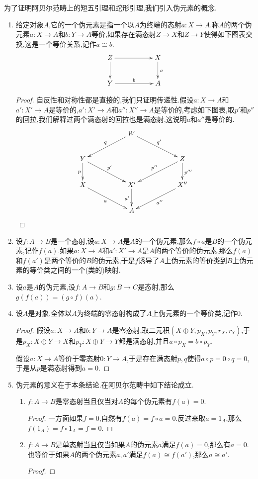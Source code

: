 为了证明阿贝尔范畴上的短五引理和蛇形引理,我们引入伪元素的概念.
\begin{enumerate}
	\item 给定对象$A$,它的一个伪元素是指一个以$A$为终端的态射$a:X\to A$.称$A$的两个伪元素$a:X\to A$和$b:Y\to A$等价,如果存在满态射$Z\to X$和$Z\to Y$使得如下图表交换,这是一个等价关系,记作$a\cong b$.
	$$\xymatrix{Z\ar[rr]\ar[d]&&X\ar[d]^a\\Y\ar[rr]^b&&A}$$
	\begin{proof}
		
		自反性和对称性都是直接的,我们只证明传递性.假设$a:X\to A$和$a':X'\to A$是等价的,$a':X'\to A$和$a'':X''\to A$是等价的,考虑如下图表,取$p'$和$p''$的回拉,我们解释过两个满态射的回拉也是满态射,这说明$a$和$a''$是等价的.
		$$\xymatrix{&&W\ar[dll]_q\ar[drr]^{q'}&&\\Y\ar[d]_p\ar[drr]^{p'}&&&&Z\ar[d]^{p'''}\ar[dll]_{p''}\\X\ar[drr]_a&&X'\ar[d]_{a'}&&X''\ar[dll]^{a''}\\&&A&&}$$
	\end{proof}
	\item 设$f:A\to B$是一个态射,设$a:X\to A$是$A$的一个伪元素,那么$f\circ a$是$B$的一个伪元素,记作$f(a)$.如果$a:X\to A$和$a':X'\to A$是$A$的两个等价的伪元素,那么$f(a)$和$f(a')$是两个等价的$B$的伪元素,于是$f$诱导了$A$上伪元素的等价类到$B$上伪元素的等价类之间的一个(类的)映射.
	\item 设$a$是$A$的伪元素,设$f:A\to B$和$g:B\to C$是态射,那么$g(f(a))=(g\circ f)(a)$.
	\item 设$A$是对象,全体以$A$为终端的零态射构成了$A$上伪元素的一个等价类,记作0.
	\begin{proof}
		
		假设$a:X\to A$和$b:Y\to A$是零态射,取二元积$(X\oplus Y,p_X,p_Y,r_X,r_Y)$,于是$p_X:X\oplus Y\to X$和$p_Y:X\oplus Y\to Y$都是满态射,并且$a\circ p_X=b\circ p_Y$.
		
		假设$a:X\to A$等价于零态射$0:Y\to A$,于是存在满态射$p,q$使得$a\circ p=0\circ q=0$,于是从$p$是满态射得到$a=0$.
	\end{proof}
    \item 伪元素的意义在于本条结论.在阿贝尔范畴中如下结论成立.
    \begin{enumerate}
    	\item $f:A\to B$是零态射当且仅当对$A$的每个伪元素有$f(a)=0$.
    	\begin{proof}
    		
    		一方面如果$f=0$,自然有$f(a)=f\circ a=0$.反过来取$a=1_A$,那么$f(1_A)=f\circ 1_A=f=0$.
    	\end{proof}
        \item $f:A\to B$是单态射当且仅当如果$A$的伪元素$a$满足$f(a)=0$,那么有$a=0$.也等价于如果$A$的两个伪元素$a,a'$满足$f(a)\cong f(a')$,那么$a\cong a'$.
        \begin{proof}
        	

\end{proof}
\end{enumerate}
\end{enumerate}
